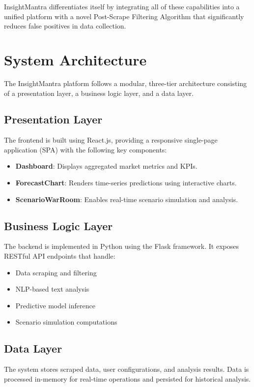 \documentclass[conference]{IEEEtran}
\begin{document}
InsightMantra differentiates itself by integrating all of these capabilities into a unified platform with a novel Post-Scrape Filtering Algorithm that significantly reduces false positives in data collection.

\section{System Architecture}

The InsightMantra platform follows a modular, three-tier architecture consisting of a presentation layer, a business logic layer, and a data layer.

\subsection{Presentation Layer}
The frontend is built using React.js, providing a responsive single-page application (SPA) with the following key components:
\begin{itemize}
    \item \textbf{Dashboard}: Displays aggregated market metrics and KPIs.
    \item \textbf{ForecastChart}: Renders time-series predictions using interactive charts.
    \item \textbf{ScenarioWarRoom}: Enables real-time scenario simulation and analysis.
\end{itemize}

\subsection{Business Logic Layer}
The backend is implemented in Python using the Flask framework. It exposes RESTful API endpoints that handle:
\begin{itemize}
    \item Data scraping and filtering
    \item NLP-based text analysis
    \item Predictive model inference
    \item Scenario simulation computations
\end{itemize}

\subsection{Data Layer}
The system stores scraped data, user configurations, and analysis results. Data is processed in-memory for real-time operations and persisted for historical analysis.
\end{document}
